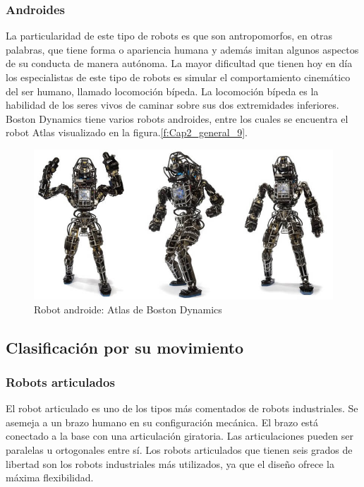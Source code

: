         \subsubsection{Androides}
        La particularidad de este tipo de robots es que son antropomorfos, en otras palabras, que tiene forma o apariencia humana y además imitan algunos aspectos de su conducta de manera autónoma. La mayor dificultad que tienen hoy en día los especialistas de este tipo de robots es simular el comportamiento cinemático del ser humano, llamado locomoción bípeda. La locomoción bípeda es la habilidad de los seres vivos de caminar sobre sus dos extremidades inferiores. Boston Dynamics tiene varios robots androides, entre los cuales se encuentra el robot Atlas visualizado en la figura.\eqref{f:Cap2_general_9}.
        
        \begin{figure}[htb]
            \centering
            \includegraphics[width=0.65\linewidth]{Main/Chapter2/Images2/Robot-androide.png}
            \caption{Robot androide: Atlas de Boston Dynamics \cite{cap2_androide}}
            \label{f:Cap2_general_9}
        \end{figure}
        
        \newpage

    
    \subsection{Clasificación por su movimiento}
    
        \subsubsection{Robots articulados}
        
        El robot articulado es uno de los tipos más comentados de robots industriales. Se asemeja a un brazo humano en su configuración mecánica. El brazo está conectado a la base con una articulación giratoria. Las articulaciones pueden ser paralelas u ortogonales entre sí. Los robots articulados que tienen seis grados de libertad son los robots industriales más utilizados, ya que el diseño ofrece la máxima flexibilidad.
        
